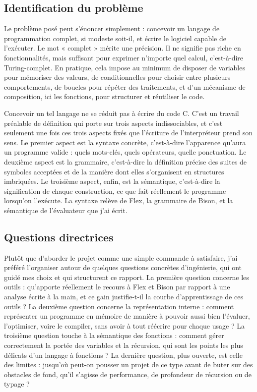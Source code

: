 \subsection{Identification du problème}

Le problème posé peut s'énoncer simplement : concevoir un langage de programmation
complet, si modeste soit-il, et écrire le logiciel capable de l'exécuter. Le mot
« complet » mérite une précision. Il ne signifie pas riche en fonctionnalités,
mais suffisant pour exprimer n'importe quel calcul, c'est-à-dire Turing-complet.
En pratique, cela impose au minimum de disposer de variables pour mémoriser des
valeurs, de conditionnelles pour choisir entre plusieurs comportements, de boucles
pour répéter des traitements, et d'un mécanisme de composition, ici les fonctions,
pour structurer et réutiliser le code.

Concevoir un tel langage ne se réduit pas à écrire du code C. C'est un travail
préalable de définition qui porte sur trois aspects indissociables, et c'est
seulement une fois ces trois aspects fixés que l'écriture de l'interpréteur prend
son sens. Le premier aspect est la syntaxe concrète, c'est-à-dire l'apparence
qu'aura un programme valide : quels mots-clés, quels opérateurs, quelle
ponctuation. Le deuxième aspect est la grammaire, c'est-à-dire la définition
précise des suites de symboles acceptées et de la manière dont elles s'organisent
en structures imbriquées. Le troisième aspect, enfin, est la sémantique,
c'est-à-dire la signification de chaque construction, ce que fait réellement le
programme lorsqu'on l'exécute. La syntaxe relève de Flex, la grammaire de Bison,
et la sémantique de l'évaluateur que j'ai écrit.

\subsection{Questions directrices}

Plutôt que d'aborder le projet comme une simple commande à satisfaire, j'ai
préféré l'organiser autour de quelques questions concrètes d'ingénierie, qui ont
guidé mes choix et qui structurent ce rapport. La première question concerne les
outils : qu'apporte réellement le recours à Flex et Bison par rapport à une analyse
écrite à la main, et ce gain justifie-t-il la courbe d'apprentissage de ces
outils ? La deuxième question concerne la représentation interne : comment
représenter un programme en mémoire de manière à pouvoir aussi bien l'évaluer,
l'optimiser, voire le compiler, sans avoir à tout réécrire pour chaque usage ? La
troisième question touche à la sémantique des fonctions : comment gérer
correctement la portée des variables et la récursion, qui sont les points les plus
délicats d'un langage à fonctions ? La dernière question, plus ouverte, est celle
des limites : jusqu'où peut-on pousser un projet de ce type avant de buter sur des
obstacles de fond, qu'il s'agisse de performance, de profondeur de récursion ou de
typage ?

